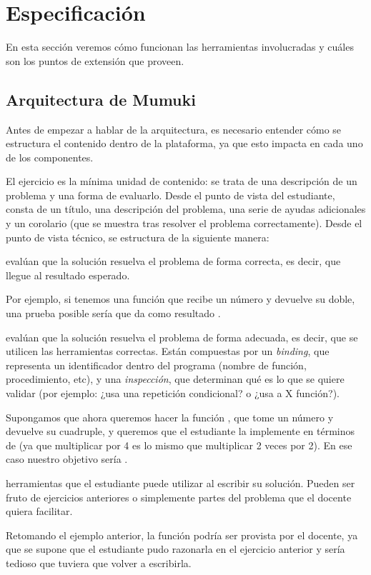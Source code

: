 
\section{Especificación}
En esta sección veremos cómo funcionan las herramientas involucradas y cuáles son los puntos de extensión que proveen.

\subsection{Arquitectura de Mumuki}
Antes de empezar a hablar de la arquitectura, es necesario entender cómo se estructura el contenido dentro de la plataforma, ya que esto impacta en cada uno de los componentes.

El ejercicio es la mínima unidad de contenido: se trata de una descripción de un problema y una forma de evaluarlo. Desde el punto de vista del estudiante, consta de un título, una descripción del problema, una serie de ayudas adicionales y un corolario (que se muestra tras resolver el problema correctamente). Desde el punto de vista técnico, se estructura de la siguiente manera:

\begin{itemize}
   evalúan que la solución resuelva el problema de forma correcta, es decir, que llegue al resultado esperado.

  Por ejemplo, si tenemos una función  que recibe un número y devuelve su doble, una prueba posible sería que  da como resultado .

   evalúan que la solución resuelva el problema de forma adecuada, es decir, que se utilicen las herramientas correctas. Están compuestas por un \emph{binding}, que representa un identificador dentro del programa (nombre de función, procedimiento, etc), y una \emph{inspección}, que determinan qué es lo que se quiere validar (por ejemplo: ¿usa una repetición condicional? o ¿usa a X función?).

  Supongamos que ahora queremos hacer la función , que tome un número y devuelve su cuadruple, y queremos que el estudiante la implemente en términos de  (ya que multiplicar por 4 es lo mismo que multiplicar 2 veces por 2). En ese caso nuestro objetivo sería .

   herramientas que el estudiante puede utilizar al escribir su solución. Pueden ser fruto de ejercicios anteriores o simplemente partes del problema que el docente quiera facilitar.

  Retomando el ejemplo anterior, la función  podría ser provista por el docente, ya que se supone que el estudiante pudo razonarla en el ejercicio anterior y sería tedioso que tuviera que volver a escribirla.
\end{itemize}

